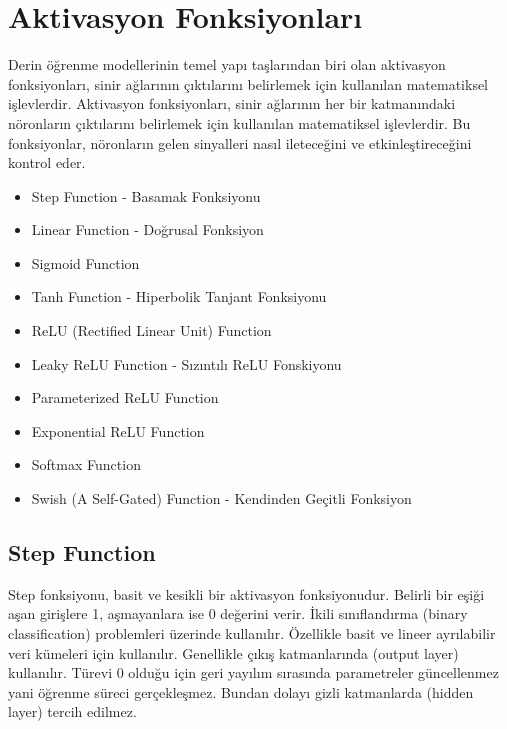 \section{Aktivasyon Fonksiyonları}
Derin öğrenme modellerinin temel yapı taşlarından biri olan aktivasyon fonksiyonları, sinir ağlarının çıktılarını belirlemek için kullanılan matematiksel işlevlerdir. Aktivasyon fonksiyonları, sinir ağlarının her bir katmanındaki nöronların çıktılarını belirlemek için kullanılan matematiksel işlevlerdir. Bu fonksiyonlar, nöronların gelen sinyalleri nasıl ileteceğini ve etkinleştireceğini kontrol eder.

\begin{itemize}
    \item Step Function - Basamak Fonksiyonu
    \item Linear Function - Doğrusal Fonksiyon
    \item Sigmoid Function
    \item Tanh Function - Hiperbolik Tanjant Fonksiyonu
    \item ReLU (Rectified Linear Unit) Function
    \item Leaky ReLU Function - Sızıntılı ReLU Fonskiyonu
    \item Parameterized ReLU Function
    \item Exponential ReLU Function
    \item Softmax Function
    \item Swish (A Self-Gated) Function - Kendinden Geçitli Fonksiyon
\end{itemize}

\newpage

\subsection{Step Function}
Step fonksiyonu, basit ve kesikli bir aktivasyon fonksiyonudur. Belirli bir eşiği aşan girişlere 1, aşmayanlara ise 0 değerini verir. İkili sınıflandırma (binary classification) problemleri üzerinde kullanılır. Özellikle basit ve lineer ayrılabilir veri kümeleri için kullanılır. Genellikle çıkış katmanlarında (output layer) kullanılır. Türevi 0 olduğu için geri yayılım sırasında parametreler güncellenmez yani öğrenme süreci gerçekleşmez. Bundan dolayı gizli katmanlarda (hidden layer) tercih edilmez.

